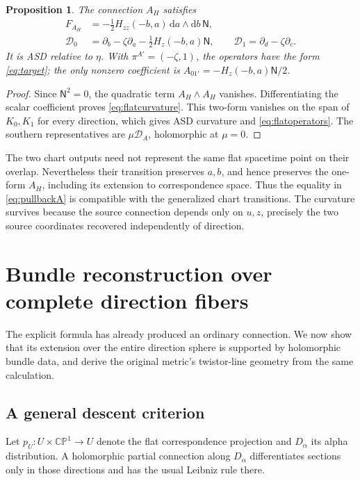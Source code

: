 \documentclass[11pt]{article}
\numberwithin{equation}{section}
\newtheorem{proposition}[theorem]{Proposition}
\theoremstyle{definition}
\theoremstyle{remark}
\newcommand{\CP}{\mathbb{CP}}
\newcommand{\dd}{\mathrm d}
\newcommand{\NN}{\mathsf N}
\begin{document}
\begin{proposition}\label{prop:directdescent}
The connection $A_H$ satisfies
\begin{align}
F_{A_H}&=-\frac12H_{zz}(-b,a)\,\dd a\wedge\dd b\,\NN,
\label{eq:flatcurvature}\\
\mathcal D_0&=\partial_b-\zeta\partial_a-\frac12H_z(-b,a)\NN,
\qquad
\mathcal D_1=\partial_d-\zeta\partial_c.
\label{eq:flatoperators}
\end{align}
It is ASD relative to $\eta$. With $\pi^{A'}=(-\zeta,1)$, the operators have the form \eqref{eq:target}; the only nonzero coefficient is $A_{01'}=-H_z(-b,a)\NN/2$.
\end{proposition}
\begin{proof}
Since $\NN^2=0$, the quadratic term $A_H\wedge A_H$ vanishes. Differentiating the scalar coefficient proves \eqref{eq:flatcurvature}. This two-form vanishes on the span of $K_0,K_1$ for every direction, which gives ASD curvature and \eqref{eq:flatoperators}. The southern representatives are $\mu\mathcal D_A$, holomorphic at $\mu=0$.
\end{proof}

The two chart outputs need not represent the same flat spacetime point on their overlap. Nevertheless their transition preserves $a,b$, and hence preserves the one-form $A_H$, including its extension to correspondence space. Thus the equality in \eqref{eq:pullbackA} is compatible with the generalized chart transitions. The curvature survives because the source connection depends only on $u,z$, precisely the two source coordinates recovered independently of direction.

\section{Bundle reconstruction over complete direction fibers}\label{sec:bundle}

The explicit formula has already produced an ordinary connection. We now show that its extension over the entire direction sphere is supported by holomorphic bundle data, and derive the original metric's twistor-line geometry from the same calculation.

\subsection{A general descent criterion}

Let $p_U:U\times\CP^1\to U$ denote the flat correspondence projection and $D_\alpha$ its alpha distribution. A holomorphic partial connection along $D_\alpha$ differentiates sections only in those directions and has the usual Leibniz rule there.
\end{document}
